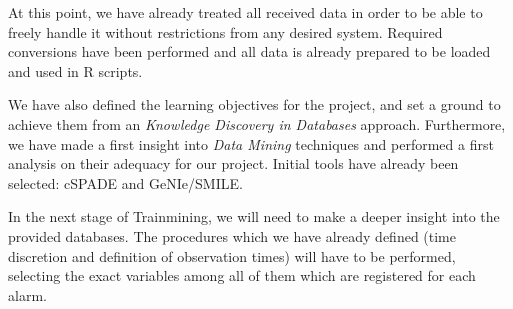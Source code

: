 At this point, we have already treated all received data in order to be able to freely handle it without restrictions from any desired system. Required conversions have been performed and all data is already prepared to be loaded and used in R scripts.

We have also defined the learning objectives for the project, and set a ground to achieve them from an \emph{Knowledge Discovery in Databases} approach. Furthermore, we have made a first insight into \emph{Data Mining} techniques and performed a first analysis on their adequacy for our project. Initial tools have already been selected: cSPADE and GeNIe/SMILE.

In the next stage of Trainmining, we will need to make a deeper insight into the provided databases. The procedures which we have already defined (time discretion and definition of observation times) will have to be performed, selecting the exact variables among all of them which are registered for each alarm.